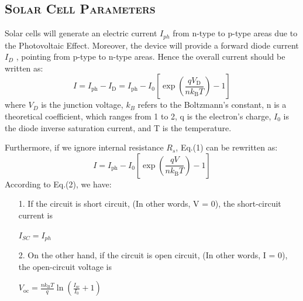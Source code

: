 \documentclass[a4paper,12pt]{article}
\begin{document}
\subsection{\textsc{Solar Cell Parameters}}
Solar cells will generate an electric current $I_{ph}$ from n-type to p-type areas due to the Photovoltaic Effect. Moreover, the device will provide a forward diode current $I_D$ , pointing from p-type to n-type areas. Hence the overall current should be written as:
\begin{equation}
I=I_{\mathrm{ph}}-I_{\mathrm{D}}=I_{\mathrm{ph}}-I_{0}\left[\exp \left(\frac{q V_{\mathrm{D}}}{n k_{\mathrm{B}} T}\right)-1\right]
\end{equation}
where $V_D$ is the junction voltage, $k_B$ refers to the Boltzmann’s constant, n is a theoretical coefficient, which ranges from 1 to 2, q is the electron’s charge, $I_0$ is the diode inverse saturation current, and T is the temperature.
\par Furthermore, if we ignore internal resistance $R_s$, Eq.(1) can be rewritten as:
\begin{equation}
I=I_{\mathrm{ph}}-I_{0}\left[\exp \left(\frac{q V}{n k_{\mathrm{B}} T}\right)-1\right]
\end{equation}
According to Eq.(2), we have:
\begin{itemize}
\item[1.] If the circuit is short circuit, (In other words, V = 0), the short-circuit current is 
		\begin{center}
		$ I_{SC} = I_{ph} $
		\end{center}
\item[2.] On the other hand, if the circuit is open circuit, (In other words, I = 0), the open-circuit voltage is 
		\begin{center}
		$\displaystyle V_{\mathrm{oc}}=\frac{n k_{\mathrm{B}} T}{q} \ln \left(\frac{I_{\mathrm{sc}}}{I_{0}}+1\right) $
		\end{center}
\end{itemize}
\end{document}
